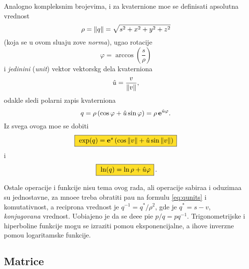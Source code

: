 Analogno kompleksnim brojevima, i za kvaternione mo{\zv}e se definisati apsolutna vrednost
$$
\rho = {\Vert q\Vert} = \sqrt{s^2+x^2+y^2+z^2}
$$
(koja se u ovom slu{\cv}aju zove {\sl norma\/}),
ugao rotacije
$$
\varphi = \arccos\left( \frac s\rho \right)
$$
i {\sl jedini{\cv}ni\/} ({\sl unit\/}) vektor vektorskg dela kvaterniona
$$
{\hat u} = \frac v{{\Vert v\Vert}},
$$
odakle sledi polarni zapis kvaterniona
\begin{equation}
    q
=\rho\,(\cos\varphi + {\hat u}\sin\varphi)
=\rho\,{\bf e}^{{\hat u}\varphi}.
\end{equation}
Iz svega ovoga mo{\zv}e se dobiti
\begin{equation}
    \okvir{\exp(q) = \e^s \left( \cos\norm v + \uv\sin\norm v \right)}
\end{equation}
i
\begin{equation}
    \okvir{\ln(q)  = \ln\rho + \uv\varphi}.
\end{equation}

\medskip

\danger
Ostale operacije i funkcije nisu tema ovog rada, ali operacije sabira{\nj}a i oduzima{\nj}a
su jednostavne, za mno{\zv}e{\nj}e treba obratiti pa{\zv}{\nj}u na formulu \eqref{eq:qunits} i
komutativnost, a recipro{\cv}na vrednost je
$q^{-1}={q^*}/\rho^2$, gde je ${q^*}=s-v$, {\sl konjugovana\/} vrednost. 
Uobi{\cv}ajeno je da se de{\lj}e{\nj}e pi{\sv}e $p/q=pq^{-1}$.
Trigonometrijske i hiperboli{\cv}ne funkcije mogu se izraziti pomo{\cc}u eksponencijalne,
a {\nj}ihove inverzne pomo{\cc}u logaritamske funkcije.


\newpage

\subsection{Matrice}

\newpage
